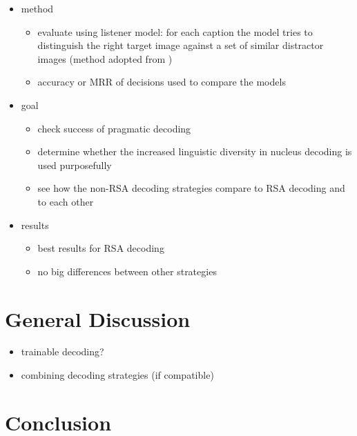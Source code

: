 \documentclass[11pt,a4paper]{article}
\begin{document}
\begin{itemize}

\item method
	\begin{itemize}
	\item evaluate using listener model: for each caption the model tries to distinguish the right target image against a set of similar distractor images (method adopted from \citet{Cohn-Gordon2018})
	\item accuracy or MRR of decisions used to compare the models
	\end{itemize}

\item goal
	\begin{itemize}
	\item check success of pragmatic decoding	
	\item determine whether the increased linguistic diversity in nucleus decoding is used purposefully
	\item see how the non-RSA decoding strategies compare to RSA decoding and to each other
	\end{itemize}

\item results
	\begin{itemize}
	\item best results for RSA decoding
	\item no big differences between other strategies
	\end{itemize}

\end{itemize}

\section{General Discussion}

\begin{itemize}
	\item trainable decoding?
	\item combining decoding strategies (if compatible)
\end{itemize}

\section{Conclusion}








\end{document}
